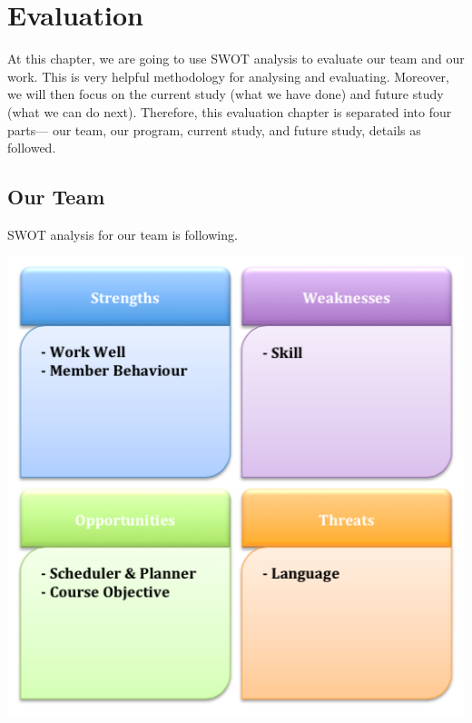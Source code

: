 \documentclass[11pt]{article}
\begin{document}
\section{Evaluation}
	\indent\indent At this chapter, we are going to use SWOT analysis to evaluate our team and our work. This is very helpful methodology for analysing and evaluating. Moreover, we will then focus on the current study (what we have done) and future study (what we can do next). Therefore, this evaluation chapter is separated into four parts— our team, our program, current study, and future study, details as followed.
	\subsection{Our Team}
	\indent\indent SWOT analysis for our team is following.
	\begin{center}			
			\includegraphics[scale = 0.4]{Figure02}
	\end{center}
\end{document}
